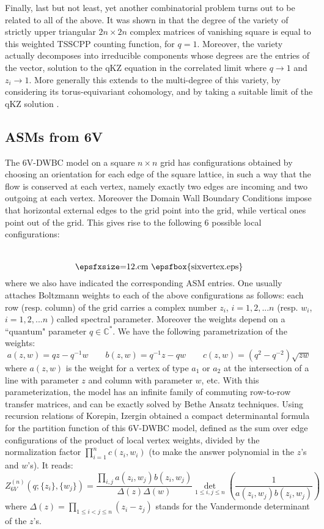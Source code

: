 \documentclass[12pt]{amsart}
\numberwithin{equation}{section}
\begin{document}
Finally, last but not least, yet another combinatorial problem turns out to be related to all of the above.
It was shown in \cite{DZJ2} that the degree
of the variety of strictly upper triangular $2n\times 2n$ complex matrices of vanishing square is equal to this 
weighted TSSCPP counting function, for $q=1$. Moreover, the variety actually decomposes into irreducible components
whose degrees are the entries of the vector, solution to the qKZ equation in the correlated limit where
$q\to 1$ and $z_i\to 1$.
More generally this extends to the  multi-degree of this variety, by considering its torus-equivariant cohomology, and by
taking a suitable limit of the qKZ solution \cite{DZJ2,KZ}. 

\subsection{ASMs from 6V}

The 6V-DWBC model on a square $n\times n$ grid has configurations obtained by choosing
an orientation for each edge of the square lattice, in such a way that the flow is conserved at each vertex,
namely exactly two edges are incoming and two outgoing at each vertex. Moreover the Domain Wall Boundary Conditions
impose that horizontal external edges to the grid point into the grid, while vertical ones point out of the grid.
This gives rise to the following 6 possible
local configurations:
$$\raisebox{-1.cm}{\hbox{\epsfxsize=12.cm \epsfbox{sixvertex.eps}}} 
$$
where we also have indicated the corresponding ASM entries.
One usually attaches Boltzmann weights to each of the above configurations as follows: each row (resp. column)
of the grid carries a complex number $z_i$, $i=1,2,...n$ (resp. $w_i$, $i=1,2,...n$ ) called spectral parameter.
Moreover the weights depend on a ``quantum" parameter $q\in {{\mathbb C}}^*$.
We have the following parametrization of the weights:
$$ a(z,w)=q z-q^{-1} w \qquad b(z,w)=q^{-1} z -q w \qquad c(z,w)=(q^2-q^{-2}) \sqrt{z w} $$
where $a(z,w)$ is the weight for a vertex of type $a_1$ or $a_2$ at the intersection of a line with
parameter $z$ and column with parameter $w$, etc. With this parameterization, the model has an infinite
family of commuting row-to-row transfer matrices, and can be exactly solved by Bethe Ansatz techniques.
Using recursion relations of Korepin\cite{KO}, Izergin\cite{IZ} obtained a compact determinantal formula for the partition function
of this 6V-DWBC model, defined as the sum over edge configurations of the product of local vertex weights,
divided by the normalization factor $\prod_{i=1}^n c(z_i,w_i)$ (to make the answer polynomial in the $z$'s and $w$'s).
It reads:
\begin{equation}\label{IK} 
Z_{6V}^{(n)}(q;\{z_i\},\{w_j\})=\frac{\prod_{i,j} a(z_i,w_j)b(z_i,w_j)}{\Delta(z)\Delta(w)}
\det_{1\leq i,j\leq n} \left( \frac{1}{a(z_i,w_j)b(z_i,w_j)}\right)
\end{equation}
where $\Delta(z)=\prod_{1\leq i<j\leq n}(z_i-z_j)$ stands for the Vandermonde determinant of the $z$'s.
\end{document}
